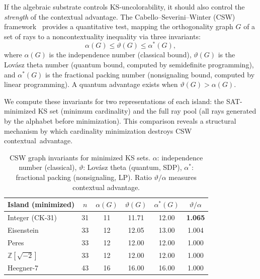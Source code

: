 \documentclass[12pt,a4paper]{article}
\newcommand{\Z}{\mathbb{Z}}
\begin{document}
If the algebraic substrate controls KS-uncolorability, it should also control the \emph{strength} of the contextual advantage. The Cabello--Severini--Winter (CSW) framework~\cite{CabelloSeveriniWinter2014} provides a quantitative test, mapping the orthogonality graph $G$ of a set of rays to a noncontextuality inequality via three invariants:
\[
\alpha(G) \leq \vartheta(G) \leq \alpha^*(G),
\]
where $\alpha(G)$ is the independence number (classical bound), $\vartheta(G)$ is the Lov\'asz theta number (quantum bound, computed by semidefinite programming), and $\alpha^*(G)$ is the fractional packing number (nonsignaling bound, computed by linear programming). A quantum advantage exists when $\vartheta(G) > \alpha(G)$.

We compute these invariants for two representations of each island: the SAT-minimized KS set (minimum cardinality) and the full ray pool (all rays generated by the alphabet before minimization). This comparison reveals a structural mechanism by which cardinality minimization destroys CSW contextual~advantage.

\begin{table}[ht]
\centering
\caption{CSW graph invariants for minimized KS sets. $\alpha$: independence number (classical), $\vartheta$: Lov\'asz theta (quantum, SDP), $\alpha^*$: fractional packing (nonsignaling, LP). Ratio $\vartheta/\alpha$ measures contextual advantage.}
\label{tab:csw-min}
\begin{tabular}{lccccc}
\toprule
Island (minimized) & $n$ & $\alpha(G)$ & $\vartheta(G)$ & $\alpha^*(G)$ & $\vartheta/\alpha$ \\
\midrule
Integer (CK-31) & 31 & 11 & 11.71 & 12.00 & \textbf{1.065} \\
Eisenstein & 33 & 12 & 12.05 & 13.00 & 1.004 \\
Peres & 33 & 12 & 12.00 & 12.00 & 1.000 \\
$\Z[\sqrt{-2}]$ & 33 & 12 & 12.00 & 12.00 & 1.000 \\
Heegner-7 & 43 & 16 & 16.00 & 16.00 & 1.000 \\
\bottomrule
\end{tabular}
\end{table}
\end{document}
